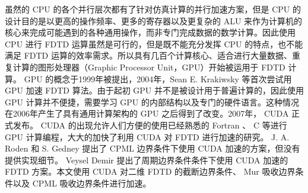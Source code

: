 虽然的 CPU 的各个并行层次都有了针对仿真计算的并行加速方案，但是 CPU 的设计目的是以更高的操作频率、更多的寄存器以及更复杂的 ALU 来作为计算机的核心来完成可能遇到的各种通用操作，而非专门完成数据的数学计算。因此使用 CPU 进行 FDTD 运算虽然是可行的，但是既不能充分发挥 CPU 的特点，也不能满足 FDTD 运算的效率需求。所以具有几百个计算核心、适合进行大量数据、重复计算的图形处理器（Graphic Processor Unit，GPU）开始被运用于 FDTD 计算。 GPU 的概念于1999年被提出，2004年，Sean E. Krakiwsky 等\cite{Krakiwsky}首次尝试用 GPU 加速 FDTD 算法。由于起初 GPU 并不是被设计用于普遍计算的，因此使用 GPU 计算并不便捷，需要学习 GPU 的内部结构以及专门的硬件语言。这种情况在2006年产生了具有通用计算架构的 GPU 之后得到了改变。2007年， CUDA 正式发布。 CUDA 的出现允许人们方便的使用已经熟悉的 Fortran 、 C 等进行 GPU 计算编程，大大的加快了利用 CUDA 对 FDTD 进行加速的研究。 J. A. Roden 和 S. Gedney\cite{Roden} 提出了 CPML 边界条件下使用 CUDA 加速的方案，但没有提供实现细节。 Veysel Demir \cite{Demir}提出了周期边界条件条件下使用 CUDA 加速的 FDTD 方案。本文使用 CUDA 对二维 FDTD 的截断边界条件、 Mur 吸收边界条件以及 CPML 吸收边界条件进行加速。

